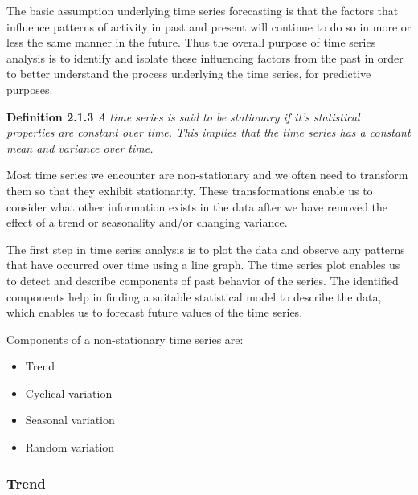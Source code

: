       \vspace{1em}

      The basic assumption underlying time series forecasting is that the factors that influence patterns of activity in past and present will continue to do so in more or less the same manner in the future. Thus the overall purpose of time series analysis is to identify and isolate these influencing factors from the past in order to better understand the process underlying the time series, for predictive purposes.

      \vspace{1em}

      \textbf{Definition 2.1.3} \cite{Watson2025} \textit{A time series is said to be stationary if it's statistical properties are constant over time. This implies that the time series has a constant mean and variance over time.}

      \vspace{1em}

      Most time series we encounter are non-stationary and we often need to transform them so that they exhibit stationarity. These transformations enable us to consider what other information exists in the data after we have removed the effect of a trend or seasonality and/or changing variance.

      \vspace{1em}

      The first step in time series analysis is to plot the data and observe any patterns that have occurred over time using a line graph. The time series plot enables us to detect and describe components of past behavior of the series. The identified components help in finding a suitable statistical model to describe the data, which enables us to forecast future values of the time series.

      \vspace{1em}

      Components of a non-stationary time series are:
      \begin{itemize}
         \item Trend
         \item Cyclical variation
         \item Seasonal variation
         \item Random variation
      \end{itemize}

      \subsubsection{Trend}

